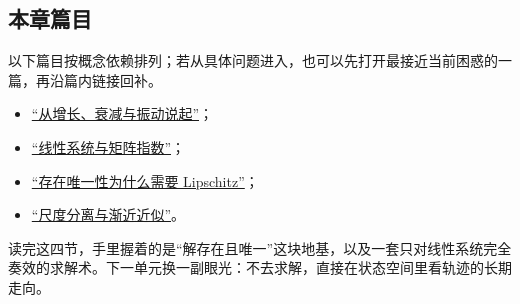 \subsection{本章篇目}

以下篇目按概念依赖排列；若从具体问题进入，也可以先打开最接近当前困惑的一篇，再沿篇内链接回补。

\begin{itemize}
\tightlist
\item \hyperref[sec:15-Differential-Equations-and-Dynamical-Systems/01-ODE-Theory/01]{``从增长、衰减与振动说起''}；
\item \hyperref[sec:15-Differential-Equations-and-Dynamical-Systems/01-ODE-Theory/02]{``线性系统与矩阵指数''}；
\item \hyperref[sec:15-Differential-Equations-and-Dynamical-Systems/01-ODE-Theory/03]{``存在唯一性为什么需要 Lipschitz''}；
\item \hyperref[sec:15-Differential-Equations-and-Dynamical-Systems/01-ODE-Theory/04]{``尺度分离与渐近近似''}。
\end{itemize}

读完这四节，手里握着的是``解存在且唯一''这块地基，以及一套只对线性系统完全奏效的求解术。下一单元换一副眼光：不去求解，直接在状态空间里看轨迹的长期走向。

